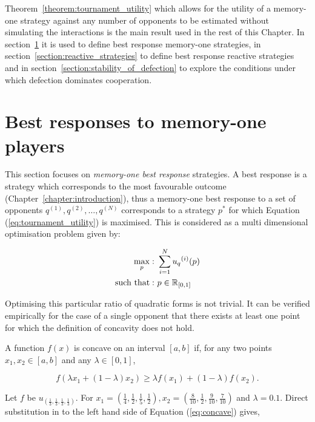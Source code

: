 Theorem~\ref{theorem:tournament_utility} which allows for the utility of a
memory-one strategy against any number of opponents to be estimated without
simulating the interactions is the main result used in the rest of this Chapter. In
section~\ref{section:best_response_mem_one} it is used to define best response
memory-one strategies, in section~\ref{section:reactive_strategies} to define best response
reactive strategies and in section~\ref{section:stability_of_defection}
to explore the conditions under which defection dominates cooperation.

\section{Best responses to memory-one players}\label{section:best_response_mem_one}

This section focuses on \textit{memory-one
best response} strategies. A best response is a strategy which
corresponds to the most favourable outcome (Chapter~\ref{chapter:introduction}), thus a memory-one
best response to a set of opponents \(q^{(1)}, q^{(2)}, \dots, q^{(N)}\) corresponds to a strategy \(p^*\) for which
Equation (\ref{eq:tournament_utility}) is maximised. This is considered as a multi
dimensional optimisation problem given by:

\begin{equation}\label{eq:mo_tournament_optimisation}
    \begin{aligned}
    \max_p: & \ \sum_{i=1} ^ {N} {u_q}^{(i)} (p)
    \\
    \text{such that}: & \ p \in \mathbb{R}_{[0, 1]}
    \end{aligned}
\end{equation}

Optimising this particular ratio of quadratic forms is not trivial. It can be
verified empirically for the case of a single opponent that there exists at
least one point for which the definition of concavity does not hold.

A function \(f(x)\) is concave on an interval \([a, b]\) if, for any two
points \(x_1, x_2 \in [a, b]\) and any \(\lambda \in [0, 1]\), 

\begin{equation}\label{eq:concave}
f (\lambda x_1 + (1 - \lambda )x_2 ) \geq \lambda f (x_1 ) + (1 - \lambda )f (x_2 ).
\end{equation}

Let \(f\) be \(u_{(\frac{1}{3}, \frac{1}{3}, \frac{1}{3}, \frac{1}{3})}\).
For \(x_1 = (\frac{1}{4}, \frac{1}{2}, \frac{1}{5} , \frac{1}{2}),
x_2 = (\frac{8}{10}, \frac{1}{2}, \frac{9}{10} , \frac{7}{10})\) and
\(\lambda=0.1\). Direct substitution in to the left hand side of Equation (\ref{eq:concave}) gives,

